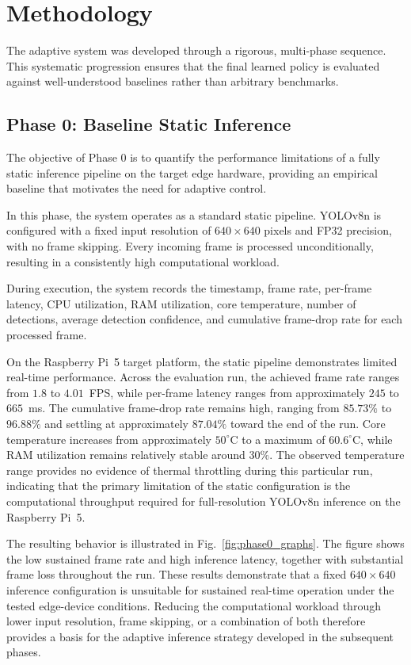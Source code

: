 \documentclass{ieeeaccess}
\begin{document}
\section{Methodology}

\label{sec:methodology}

The adaptive system was developed through a rigorous, multi-phase sequence.
This systematic progression ensures that the final learned policy is
evaluated against well-understood baselines rather than arbitrary
benchmarks.

\subsection{Phase 0: Baseline Static Inference}

The objective of Phase 0 is to quantify the performance limitations of a
fully static inference pipeline on the target edge hardware, providing an
empirical baseline that motivates the need for adaptive control.

In this phase, the system operates as a standard static pipeline. YOLOv8n is
configured with a fixed input resolution of $640 \times 640$ pixels and FP32
precision, with no frame skipping. Every incoming frame is processed
unconditionally, resulting in a consistently high computational workload.

During execution, the system records the timestamp, frame rate, per-frame
latency, CPU utilization, RAM utilization, core temperature, number of
detections, average detection confidence, and cumulative frame-drop rate for
each processed frame.

On the Raspberry Pi~5 target platform, the static pipeline demonstrates
limited real-time performance. Across the evaluation run, the achieved frame
rate ranges from $1.8$ to $4.01$~FPS, while per-frame latency ranges from
approximately $245$ to $665$~ms. The cumulative frame-drop rate remains high,
ranging from $85.73\%$ to $96.88\%$ and settling at approximately $87.04\%$
toward the end of the run. Core temperature increases from approximately
$50^\circ$C to a maximum of $60.6^\circ$C, while RAM utilization remains
relatively stable around $30\%$. The observed temperature range provides no
evidence of thermal throttling during this particular run, indicating that
the primary limitation of the static configuration is the computational
throughput required for full-resolution YOLOv8n inference on the Raspberry
Pi~5.

The resulting behavior is illustrated in Fig.~\ref{fig:phase0_graphs}. The
figure shows the low sustained frame rate and high inference latency, together
with substantial frame loss throughout the run. These results demonstrate
that a fixed $640 \times 640$ inference configuration is unsuitable for
sustained real-time operation under the tested edge-device conditions.
Reducing the computational workload through lower input resolution, frame
skipping, or a combination of both therefore provides a basis for the
adaptive inference strategy developed in the subsequent phases.
\end{document}
